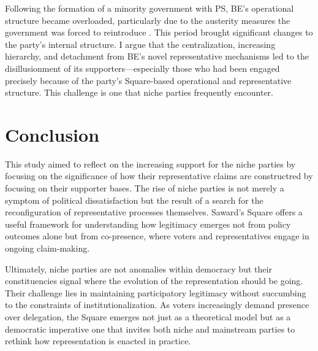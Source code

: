 Following the formation of a minority government with PS, BE's operational structure became overloaded, particularly due to the austerity measures the government was forced to reintroduce \parencite[see 17]{lisi2016}. This period brought significant changes to the party's internal structure. I argue that the centralization, increasing hierarchy, and detachment from BE's novel representative mechanisms led to the disillusionment of its supporters—especially those who had been engaged precisely because of the party’s Square-based operational and representative structure. This challenge is one that niche parties frequently encounter.

%
%
%

\chapter{Conclusion}

This study aimed to reflect on the increasing support for the niche parties by
focusing on the significance of how their representative claims are
constructred by focusing on their supporter bases. The rise of niche parties is not merely a symptom of political dissatisfaction but the result of a search for the reconfiguration of representative processes themselves. Saward’s Square offers a useful framework for understanding how legitimacy emerges not from policy outcomes alone but from co-presence, where voters and representatives engage in ongoing claim-making.

Ultimately, niche parties are not anomalies within democracy but their constituencies signal where the evolution of the representation should be going. Their challenge lies in maintaining participatory legitimacy without succumbing to the constraints of institutionalization. As voters increasingly demand presence over delegation, the Square emerges not just as a theoretical model but as a democratic imperative one that invites both niche and mainstream parties to rethink how representation is enacted in practice.

\printbibliography

